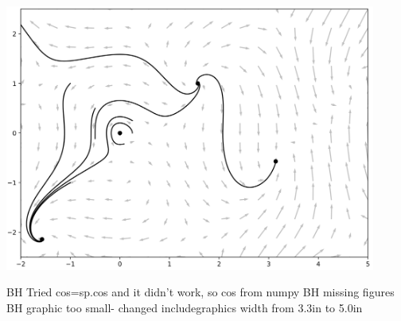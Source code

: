 \documentclass[12pt]{book}
\begin{document}
\parbox[c]{5.4in}{\includegraphics[width=4.8in]{additional_figures/Nonlinear_systems__phaseportrait_and_equilibria}}

{\color{teal}BH Tried cos=sp.cos and it didn't work, so cos from numpy}
{\color{teal}BH missing figures}
{\color{teal}BH graphic too small- changed includegraphics  width from 3.3in to 5.0in}
\end{document}
